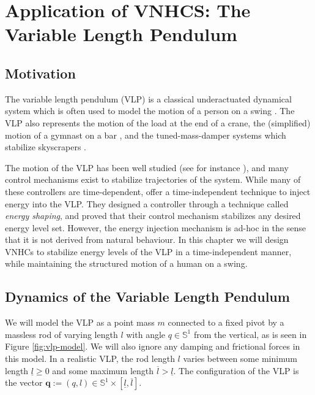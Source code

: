 
\chapter{Application of VNHCS: The Variable Length Pendulum}\label{sec:vlp}
\section{Motivation}
The variable length pendulum (VLP) is a classical underactuated dynamical system
which is often used to model the motion of a person on a swing
\cite{pumping_swing_standing_squatting,how_to_pump_a_swing}.
The VLP also represents the motion of the load at the end of a crane, 
the (simplified) motion of a gymnast on a bar
\cite{pendulum_length_giant_gymnastics}, and the tuned-mass-damper systems which
stabilize skyscrapers \cite{vlp_tuned_mass_damper}.

The motion of the VLP has been well studied (see for instance
\cite{dynamics_periodic_vlp}), and many control mechanisms exist
to stabilize trajectories of the system. While many of these controllers 
are time-dependent, \citet{vlp_energy_shaping}
offer a time-independent technique to inject energy into the VLP. 
They designed a controller through a technique called \textit{energy shaping},
and proved that their control mechanism stabilizes any desired energy level set.
However, the energy injection mechanism is ad-hoc in the sense that it is not
derived from natural behaviour. 
In this chapter we will design VNHCs to stabilize energy levels of the VLP in a
time-independent manner, while maintaining the structured motion of a human on a
swing.

\section{Dynamics of the Variable Length Pendulum}
We will model the VLP as a point mass \(m\)
connected to a fixed pivot by a massless rod of varying length \(l\) with angle 
\(q \in \mathbb{S}^1\) from the vertical, as is seen in Figure
\ref{fig:vlp-model}. 
We will also ignore any damping and frictional forces in this model.
In a realistic VLP, the rod length \(l\) varies between some minimum
length \(\underline{l} \geq 0\) and some maximum length 
\(\overline{l} > \underline{l}\). The configuration of the VLP is the vector
\(\mathbf{q} := (q,l) \in \mathbb{S}^1 \times [\underline{l},\overline{l}]\).

